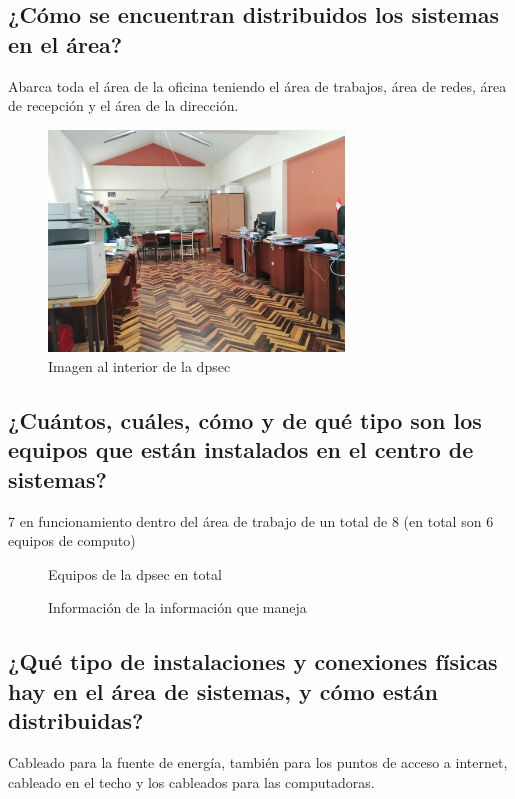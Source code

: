 \documentclass[12pt,a4paper]{article}
\begin{document}
\subsection{¿Cómo se encuentran distribuidos los sistemas en el área?}
Abarca toda el área de la oficina teniendo el área de trabajos, área de redes, área de recepción y el área de la dirección.
\begin{figure}[!htb]
    \centering
    \includegraphics[width=0.7\textwidth]{images/AreaTrabajo.jpeg}
    \caption{Imagen al interior de la dpsec}

\end{figure}

\FloatBarrier

\subsection*{¿Cuántos, cuáles, cómo y de qué tipo son los equipos que están instalados
en el centro de sistemas?}
7 en funcionamiento dentro del área de trabajo de un total de 8 (en total son 6 equipos de computo)
\begin{figure}[!htb]
    \centering
    \caption{Equipos de la dpsec en total}
\end{figure}
\FloatBarrier
\begin{figure}[!htb]
    \centering
    \caption{Información de la información que maneja}
\end{figure}
\FloatBarrier

\subsection*{¿Qué tipo de instalaciones y conexiones físicas hay en el área de sistemas, y
cómo están distribuidas?}
Cableado  para la fuente de energía, también para los puntos de acceso a internet, cableado en el techo y los cableados para las computadoras.
\end{document}
